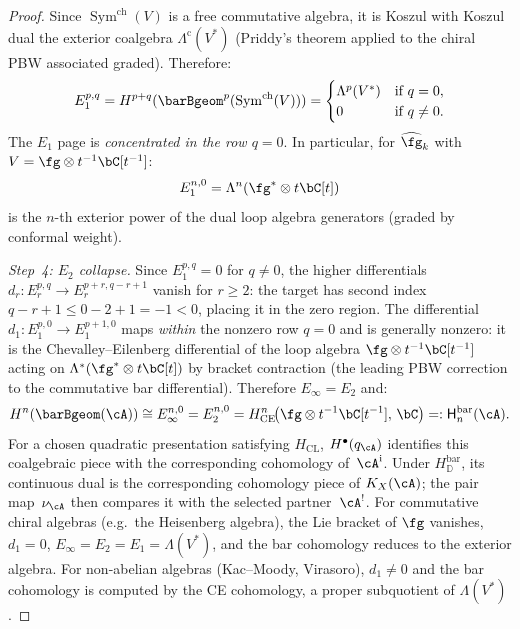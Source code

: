 \begin{proof}
Since $\operatorname{Sym}^{\mathrm{ch}}(V)$ is a free
commutative algebra, it is Koszul with Koszul dual
 the exterior coalgebra $\Lambda^{\mathrm{c}}(V^*)$
 (Priddy's theorem applied to the chiral PBW associated graded).
Therefore:
\begin{equation}\label{eq:e1-page-exterior}
E_1^{p,q} = H^{p+q}(\barBgeom^p(\operatorname{Sym}^{\mathrm{ch}}(V)))
= \begin{cases}
\Lambda^p(V^*) & \text{if } q = 0, \\
0 & \text{if } q \neq 0.
\end{cases}
\end{equation}
The $E_1$ page is \emph{concentrated in the row $q = 0$}.
In particular, for $\widehat{\fg}_k$ with
$V = \fg \otimes t^{-1}\bC[t^{-1}]$:
\[
E_1^{n,0} = \Lambda^n(\fg^* \otimes t\bC[t])
\]
is the $n$-th exterior power of the dual loop algebra
generators (graded by conformal weight).

\emph{Step~4: $E_2$ collapse.}
Since $E_1^{p,q} = 0$ for $q \neq 0$, the higher differentials
$d_r\colon E_r^{p,q} \to E_r^{p+r, q-r+1}$ vanish for
$r \geq 2$: the target has second index
$q - r + 1 \leq 0 - 2 + 1 = -1 < 0$, placing it in the
zero region. The differential
$d_1\colon E_1^{p,0} \to E_1^{p+1,0}$ maps \emph{within}
the nonzero row $q = 0$ and is generally nonzero:
it is the Chevalley--Eilenberg differential of the loop
algebra $\fg \otimes t^{-1}\bC[t^{-1}]$ acting on
$\Lambda^*(\fg^* \otimes t\bC[t])$ by bracket contraction
(the leading PBW correction to the commutative bar
differential). Therefore $E_\infty = E_2$ and:
\[
H^n(\barBgeom(\cA)) \cong E_\infty^{n,0}
= E_2^{n,0}
= H^n_{\mathrm{CE}}\!\bigl(\fg \otimes t^{-1}\bC[t^{-1}],\, \bC\bigr)
=: \mathsf H^{\mathrm{bar}}_n(\cA).
\]
For a chosen quadratic presentation satisfying $H_{\mathrm{CL}}$,
$H^\bullet(q_\cA)$ identifies this coalgebraic piece with the
corresponding cohomology of~$\cA^{\mathrm i}$.  Under
$H_{\mathbb D}^{\mathrm{bar}}$, its continuous dual is the
corresponding cohomology piece of $K_X(\cA)$; the pair map~$\nu_\cA$
then compares it with the selected partner~$\cA^!$.
For commutative chiral algebras (e.g.\ the Heisenberg algebra),
the Lie bracket of $\fg$ vanishes, $d_1 = 0$,
$E_\infty = E_2 = E_1 = \Lambda(V^*)$, and the bar cohomology
reduces to the exterior algebra. For non-abelian algebras
(Kac--Moody, Virasoro), $d_1 \neq 0$ and the bar
cohomology is computed by the CE cohomology, a proper
subquotient of $\Lambda(V^*)$.


\end{proof}
